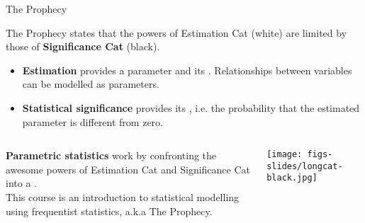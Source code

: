 \documentclass{beamer}
\begin{document}
	\begin{frame}[t]{The Prophecy}

	The Prophecy states that the powers of Estimation Cat (white) are limited by those of \textbf{Significance Cat} (black).

	\begin{itemize}
		\item \textbf{Estimation} provides a parameter and its . Relationships between variables can be modelled as parameters.
		\item \textbf{Statistical significance} provides its , i.e. the probability that the estimated parameter is different from zero.
	\end{itemize}
	
	\vspace{.5em}
	
	\begin{columns}[T]
	

	\textbf{Parametric statistics} work by confronting the awesome powers of Estimation Cat and Significance Cat into a .\\[1em]
	
	This course is an introduction to statistical modelling using frequentist statistics, a.k.a The Prophecy.
	\vspace{0em}
	\begin{flushright}
	\texttt{[image: figs-slides/longcat-black.jpg]}		
	\end{flushright}
		
	\end{columns}
		
	\end{frame}
	
	
	
\end{document}
